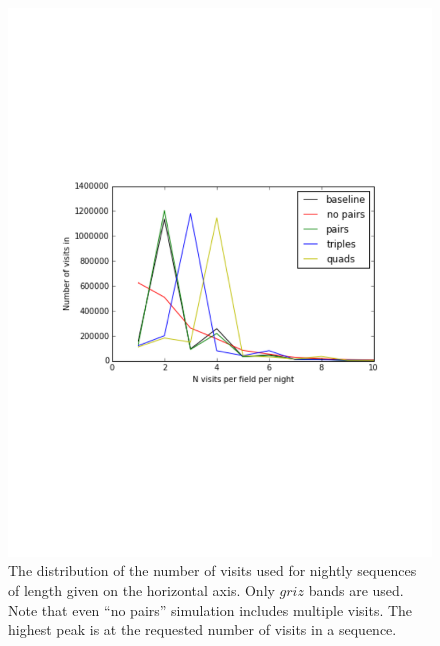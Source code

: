 \documentclass[manuscript]{article}
\begin{document}
\begin{figure}[t!]
\vskip -2.5in
\includegraphics[angle=0,width=0.99\hsize,clip]{NvisitStats.pdf}
\vskip -2.7in
\caption{The distribution of the number of visits used for nightly sequences of
length given on the horizontal axis. Only $griz$ bands are used. Note that even 
``no pairs'' simulation includes multiple visits. The highest peak is at the 
requested number of visits in a sequence.} 
\label{fig:NvisitStats}
\end{figure}
\end{document}
